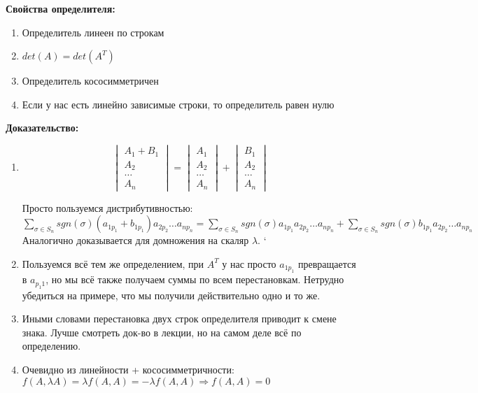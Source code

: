 \documentclass[12pt]{article}
\begin{document}
\begin{theorembox}
    \textbf{Свойства определителя:}
    \begin{enumerate}
        \item Определитель линеен по строкам
        \item $det(A) = det(A^T)$
        \item Определитель кососимметричен
        \item Если у нас есть линейно зависимые строки, то определитель равен нулю
    \end{enumerate}

    \textbf{Доказательство:}
    \begin{enumerate}
        \item \[
                    \begin{vmatrix}
                        A_1 + B_1 \\
                        A_2\\
                        \dots\\
                        A_n
                    \end{vmatrix}
                    =
                    \begin{vmatrix}
                        A_1\\
                        A_2\\
                        \dots\\
                        A_n
                    \end{vmatrix}
                    +
                    \begin{vmatrix}
                        B_1 \\
                        A_2\\
                        \dots\\
                        A_n
                    \end{vmatrix}
              \]
        
            Просто пользуемся дистрибутивностью: $\sum_{\sigma \in S_n} sgn(\sigma) (a_{1p_1} + b_{1p_1}) a_{2p_2} \dots a_{np_n} = \sum_{\sigma \in S_n} sgn(\sigma) a_{1p_1} a_{2p_2} \dots a_{np_n} + \sum_{\sigma \in S_n} sgn(\sigma) b_{1p_1} a_{2p_2} \dots a_{np_n}$\\
        
            Аналогично доказывается для домножения на скаляр $\lambda$.
    `   \item  Пользуемся всё тем же определением, при $A^T$ у нас просто $a_{1p_1}$ превращается в $a_{p_1 1}$, но мы всё также получаем суммы по всем перестановкам. Нетрудно убедиться на примере, что мы получили действительно одно и то же.
        \item Иными словами перестановка двух строк определителя приводит к смене знака. Лучше смотреть док-во в лекции, но на самом деле всё по определению.
        \item Очевидно из линейности + кососимметричности: $f(A, \lambda A) = \lambda f(A, A) = -\lambda f(A, A) \Rightarrow f(A, A) = 0$
    \end{enumerate}
\end{theorembox}
\end{document}

